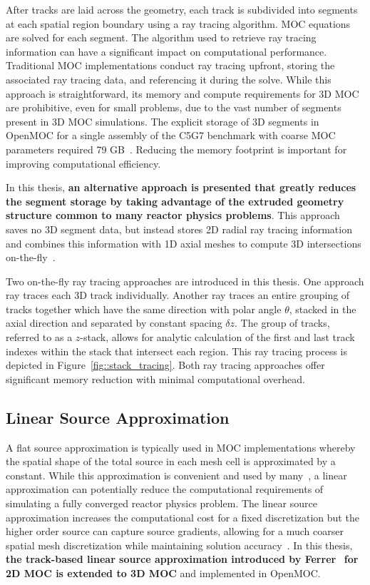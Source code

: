 \documentclass[12pt,twoside]{mitthesis-exec}
\begin{document}
After tracks are laid across the geometry, each track is subdivided into segments at each spatial region boundary using a ray tracing algorithm. MOC equations are solved for each segment. The algorithm used to retrieve ray tracing information can have a significant impact on computational performance. Traditional MOC implementations conduct ray tracing upfront, storing the associated ray tracing data, and referencing it during the solve. While this approach is straightforward, its memory and compute requirements for 3D MOC are prohibitive, even for small problems, due to the vast number of segments present in 3D MOC simulations. The explicit storage of 3D segments in OpenMOC for a single assembly of the C5G7 benchmark with coarse MOC parameters required 79 GB~\cite{physor2016otf}. Reducing the memory footprint is important for improving computational efficiency.

In this thesis, \textbf{an alternative approach is presented that greatly reduces the segment storage by taking advantage of the extruded geometry structure common to many reactor physics problems}. This approach saves no 3D segment data, but instead stores 2D radial ray tracing information and combines this information with 1D axial meshes to compute 3D intersections on-the-fly~\cite{physor2016otf}.

Two on-the-fly ray tracing approaches are introduced in this thesis. One approach ray traces each 3D track individually. Another ray traces an entire grouping of tracks together which have the same direction with polar angle $\theta$, stacked in the axial direction and separated by constant spacing $\delta z$. The group of tracks, referred to as a $z$-stack, allows for analytic calculation of the first and last track indexes within the stack that intersect each region. This ray tracing process is depicted in Figure~\ref{fig::stack_tracing}. Both ray tracing approaches offer significant memory reduction with minimal computational overhead.

\newpage
\subsection*{Linear Source Approximation}

A flat source approximation is typically used in MOC implementations whereby the spatial shape of the total source in each mesh cell is approximated by a constant. While this approximation is convenient and used by many~\cite{kochunas, liu_mrt, dragon_3d_moc, apollo3_vv, cactus_3d, mockingbird}, a linear approximation can potentially reduce the computational requirements of simulating a fully converged reactor physics problem. The linear source approximation increases the computational cost for a fixed discretization but the higher order source can capture source gradients, allowing for a much coarser spatial mesh discretization while maintaining solution accuracy~\cite{ferrer2012linear}. In this thesis, \textbf{the track-based linear source approximation introduced by Ferrer}~\cite{ferrer2015linear} \textbf{for 2D MOC is extended to 3D MOC} and implemented in OpenMOC.
\end{document}
